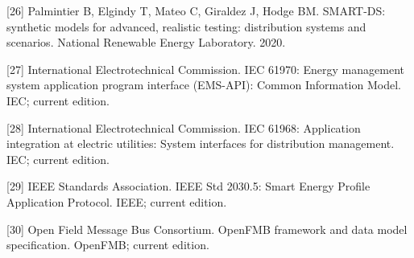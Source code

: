 \documentclass[
  preprint,12pt]{elsarticle}
\begin{document}
{[}26{]} Palmintier B, Elgindy T, Mateo C, Giraldez J, Hodge BM.
SMART-DS: synthetic models for advanced, realistic testing: distribution
systems and scenarios. National Renewable Energy Laboratory. 2020.

{[}27{]} International Electrotechnical Commission. IEC 61970: Energy
management system application program interface (EMS-API): Common
Information Model. IEC; current edition.

{[}28{]} International Electrotechnical Commission. IEC 61968:
Application integration at electric utilities: System interfaces for
distribution management. IEC; current edition.

{[}29{]} IEEE Standards Association. IEEE Std 2030.5: Smart Energy
Profile Application Protocol. IEEE; current edition.

{[}30{]} Open Field Message Bus Consortium. OpenFMB framework and data
model specification. OpenFMB; current edition.
\end{document}
